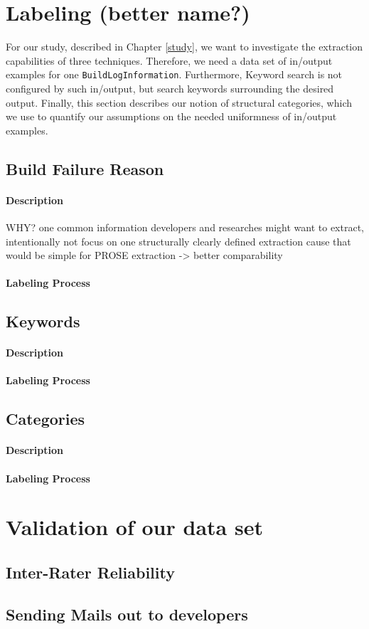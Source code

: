 \documentclass[\myrootdir/main.tex]{subfiles}
\begin{document}
\section{Labeling (better name?)}
For our study, described in Chapter \ref{study}, we want to investigate the extraction capabilities of three techniques. Therefore, we need a data set of in/output examples for one \texttt{BuildLogInformation}. Furthermore, Keyword search is not configured by such in/output, but search keywords surrounding the desired output. Finally, this section describes our notion of structural categories, which we use to quantify our assumptions on the needed uniformness of in/output examples.

  \subsection{Build Failure Reason}

    \paragraph{Description}
    WHY? one common information developers and researches might want to extract, intentionally not focus on one structurally clearly defined extraction   cause that would be simple for PROSE extraction -> better comparability
    \paragraph{Labeling Process}

  \subsection{Keywords}

    \paragraph{Description}

    \paragraph{Labeling Process}

  \subsection{Categories}

    \paragraph{Description}

    \paragraph{Labeling Process}

\section{Validation of our data set}

\subsection{Inter-Rater Reliability}

\subsection{Sending Mails out to developers}
\end{document}
